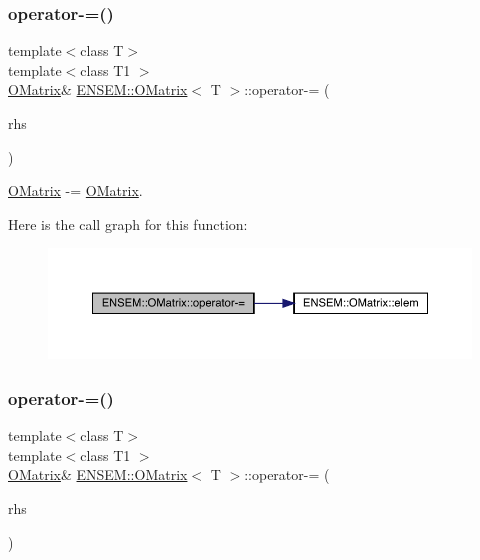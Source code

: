 \subsubsection{\texorpdfstring{operator-\/=()}{operator-=()}\hspace{0.1cm}{\footnotesize\ttfamily [2/6]}}
{\footnotesize\ttfamily template$<$class T$>$ \\
template$<$class T1 $>$ \\
\mbox{\hyperlink{classENSEM_1_1OMatrix}{O\+Matrix}}\& \mbox{\hyperlink{classENSEM_1_1OMatrix}{E\+N\+S\+E\+M\+::\+O\+Matrix}}$<$ T $>$\+::operator-\/= (\begin{DoxyParamCaption}\item[{const \mbox{\hyperlink{classENSEM_1_1OMatrix}{O\+Matrix}}$<$ T1 $>$ \&}]{rhs }\end{DoxyParamCaption})\hspace{0.3cm}{\ttfamily [inline]}}



\mbox{\hyperlink{classENSEM_1_1OMatrix}{O\+Matrix}} -\/= \mbox{\hyperlink{classENSEM_1_1OMatrix}{O\+Matrix}}. 

Here is the call graph for this function\+:
\nopagebreak
\begin{figure}[H]
\begin{center}
\leavevmode
\includegraphics[width=350pt]{dd/d80/classENSEM_1_1OMatrix_a4c9bcdd861f4439d1b165ec5285cf55f_cgraph}
\end{center}
\end{figure}
\mbox{\label{classENSEM_1_1OMatrix_a4c9bcdd861f4439d1b165ec5285cf55f}} 
\subsubsection{\texorpdfstring{operator-\/=()}{operator-=()}\hspace{0.1cm}{\footnotesize\ttfamily [3/6]}}
{\footnotesize\ttfamily template$<$class T$>$ \\
template$<$class T1 $>$ \\
\mbox{\hyperlink{classENSEM_1_1OMatrix}{O\+Matrix}}\& \mbox{\hyperlink{classENSEM_1_1OMatrix}{E\+N\+S\+E\+M\+::\+O\+Matrix}}$<$ T $>$\+::operator-\/= (\begin{DoxyParamCaption}\item[{const \mbox{\hyperlink{classENSEM_1_1OMatrix}{O\+Matrix}}$<$ T1 $>$ \&}]{rhs }\end{DoxyParamCaption})\hspace{0.3cm}{\ttfamily [inline]}}



